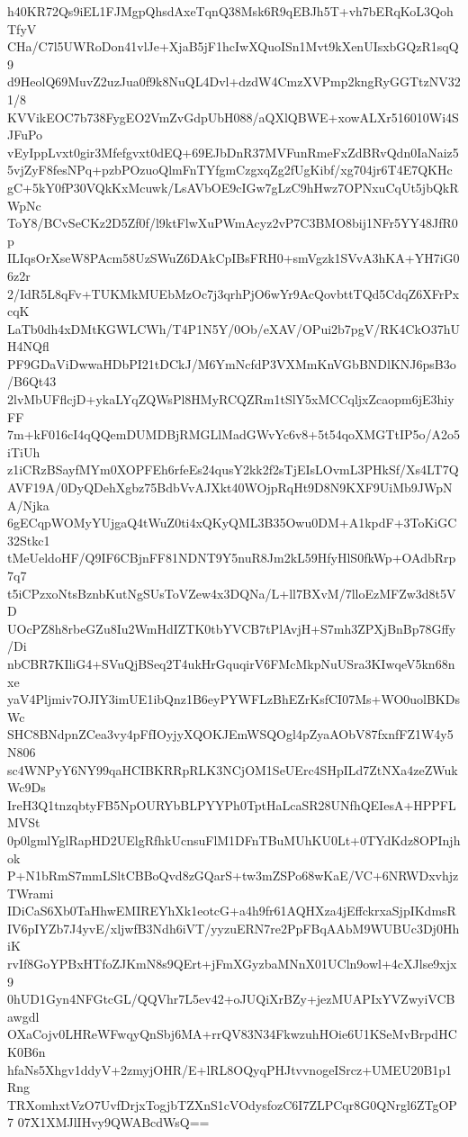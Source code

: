 h40KR72Qs9iEL1FJMgpQhsdAxeTqnQ38Msk6R9qEBJh5T+vh7bERqKoL3QohTfyV
CHa/C7l5UWRoDon41vlJe+XjaB5jF1hcIwXQuoISn1Mvt9kXenUIsxbGQzR1sqQ9
d9HeolQ69MuvZ2uzJua0f9k8NuQL4Dvl+dzdW4CmzXVPmp2kngRyGGTtzNV321/8
KVVikEOC7b738FygEO2VmZvGdpUbH088/aQXlQBWE+xowALXr516010Wi4SJFuPo
vEyIppLvxt0gir3Mfefgvxt0dEQ+69EJbDnR37MVFunRmeFxZdBRvQdn0IaNaiz5
5vjZyF8fesNPq+pzbPOzuoQlmFnTYfgmCzgxqZg2fUgKibf/xg704jr6T4E7QKHc
gC+5kY0fP30VQkKxMcuwk/LsAVbOE9cIGw7gLzC9hHwz7OPNxuCqUt5jbQkRWpNc
ToY8/BCvSeCKz2D5Zf0f/l9ktFlwXuPWmAcyz2vP7C3BMO8bij1NFr5YY48JfR0p
ILIqsOrXseW8PAcm58UzSWuZ6DAkCpIBsFRH0+smVgzk1SVvA3hKA+YH7iG06z2r
2/IdR5L8qFv+TUKMkMUEbMzOc7j3qrhPjO6wYr9AcQovbttTQd5CdqZ6XFrPxcqK
LaTb0dh4xDMtKGWLCWh/T4P1N5Y/0Ob/eXAV/OPui2b7pgV/RK4CkO37hUH4NQfl
PF9GDaViDwwaHDbPI21tDCkJ/M6YmNcfdP3VXMmKnVGbBNDlKNJ6psB3o/B6Qt43
2lvMbUFflcjD+ykaLYqZQWsPl8HMyRCQZRm1tSlY5xMCCqljxZcaopm6jE3hiyFF
7m+kF016cI4qQQemDUMDBjRMGLlMadGWvYc6v8+5t54qoXMGTtIP5o/A2o5iTiUh
z1iCRzBSayfMYm0XOPFEh6rfeEs24qusY2kk2f2sTjEIsLOvmL3PHkSf/Xs4LT7Q
AVF19A/0DyQDehXgbz75BdbVvAJXkt40WOjpRqHt9D8N9KXF9UiMb9JWpNA/Njka
6gECqpWOMyYUjgaQ4tWuZ0ti4xQKyQML3B35Owu0DM+A1kpdF+3ToKiGC32Stkc1
tMeUeldoHF/Q9IF6CBjnFF81NDNT9Y5nuR8Jm2kL59HfyHlS0fkWp+OAdbRrp7q7
t5iCPzxoNtsBznbKutNgSUsToVZew4x3DQNa/L+ll7BXvM/7lloEzMFZw3d8t5VD
UOcPZ8h8rbeGZu8Iu2WmHdIZTK0tbYVCB7tPlAvjH+S7mh3ZPXjBnBp78Gffy/Di
nbCBR7KIliG4+SVuQjBSeq2T4ukHrGquqirV6FMcMkpNuUSra3KIwqeV5kn68nxe
yaV4Pljmiv7OJIY3imUE1ibQnz1B6eyPYWFLzBhEZrKsfCI07Ms+WO0uolBKDsWc
SHC8BNdpnZCea3vy4pFfIOyjyXQOKJEmWSQOgl4pZyaAObV87fxnfFZ1W4y5N806
sc4WNPyY6NY99qaHCIBKRRpRLK3NCjOM1SeUErc4SHpILd7ZtNXa4zeZWukWc9Ds
IreH3Q1tnzqbtyFB5NpOURYbBLPYYPh0TptHaLcaSR28UNfhQEIesA+HPPFLMVSt
0p0lgmlYglRapHD2UElgRfhkUcnsuFlM1DFnTBuMUhKU0Lt+0TYdKdz8OPInjhok
P+N1bRmS7mmLSltCBBoQvd8zGQarS+tw3mZSPo68wKaE/VC+6NRWDxvhjzTWrami
IDiCaS6Xb0TaHhwEMIREYhXk1eotcG+a4h9fr61AQHXza4jEffckrxaSjpIKdmsR
IV6pIYZb7J4yvE/xljwfB3Ndh6iVT/yyzuERN7re2PpFBqAAbM9WUBUc3Dj0HhiK
rvIf8GoYPBxHTfoZJKmN8s9QErt+jFmXGyzbaMNnX01UCln9owl+4cXJlse9xjx9
0hUD1Gyn4NFGtcGL/QQVhr7L5ev42+oJUQiXrBZy+jezMUAPIxYVZwyiVCBawgdl
OXaCojv0LHReWFwqyQnSbj6MA+rrQV83N34FkwzuhHOie6U1KSeMvBrpdHCK0B6n
hfaNs5Xhgv1ddyV+2zmyjOHR/E+lRL8OQyqPHJtvvnogeISrcz+UMEU20B1p1Rng
TRXomhxtVzO7UvfDrjxTogjbTZXnS1cVOdysfozC6I7ZLPCqr8G0QNrgl6ZTgOP7
07X1XMJlIHvy9QWABcdWsQ==
